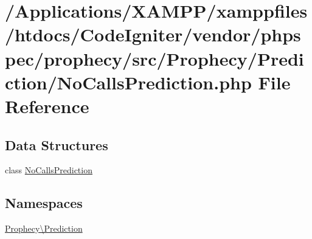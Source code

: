 \hypertarget{_no_calls_prediction_8php}{}\section{/\+Applications/\+X\+A\+M\+P\+P/xamppfiles/htdocs/\+Code\+Igniter/vendor/phpspec/prophecy/src/\+Prophecy/\+Prediction/\+No\+Calls\+Prediction.php File Reference}
\label{_no_calls_prediction_8php}
\subsection*{Data Structures}
\begin{DoxyCompactItemize}
\item 
class \mbox{\hyperlink{class_prophecy_1_1_prediction_1_1_no_calls_prediction}{No\+Calls\+Prediction}}
\end{DoxyCompactItemize}
\subsection*{Namespaces}
\begin{DoxyCompactItemize}
\item 
 \mbox{\hyperlink{namespace_prophecy_1_1_prediction}{Prophecy\textbackslash{}\+Prediction}}
\end{DoxyCompactItemize}
